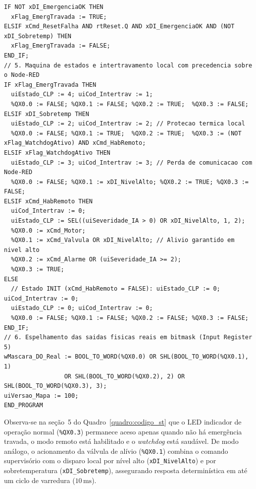 \begin{quadro}[htb]
\begin{lstlisting}[language=IECST, basicstyle=\linespread{0.85}\selectfont\ttfamily\tiny\color{black}]
IF NOT xDI_EmergenciaOK THEN
  xFlag_EmergTravada := TRUE;
ELSIF xCmd_ResetFalha AND rtReset.Q AND xDI_EmergenciaOK AND (NOT xDI_Sobretemp) THEN
  xFlag_EmergTravada := FALSE;
END_IF;
// 5. Maquina de estados e intertravamento local com precedencia sobre o Node-RED
IF xFlag_EmergTravada THEN
  uiEstado_CLP := 4; uiCod_Intertrav := 1;
  %QX0.0 := FALSE; %QX0.1 := FALSE; %QX0.2 := TRUE;  %QX0.3 := FALSE;
ELSIF xDI_Sobretemp THEN
  uiEstado_CLP := 2; uiCod_Intertrav := 2; // Protecao termica local
  %QX0.0 := FALSE; %QX0.1 := TRUE;  %QX0.2 := TRUE;  %QX0.3 := (NOT xFlag_WatchdogAtivo) AND xCmd_HabRemoto;
ELSIF xFlag_WatchdogAtivo THEN
  uiEstado_CLP := 3; uiCod_Intertrav := 3; // Perda de comunicacao com Node-RED
  %QX0.0 := FALSE; %QX0.1 := xDI_NivelAlto; %QX0.2 := TRUE; %QX0.3 := FALSE;
ELSIF xCmd_HabRemoto THEN
  uiCod_Intertrav := 0;
  uiEstado_CLP := SEL((uiSeveridade_IA > 0) OR xDI_NivelAlto, 1, 2);
  %QX0.0 := xCmd_Motor;
  %QX0.1 := xCmd_Valvula OR xDI_NivelAlto; // Alivio garantido em nivel alto
  %QX0.2 := xCmd_Alarme OR (uiSeveridade_IA >= 2);
  %QX0.3 := TRUE;
ELSE
  // Estado INIT (xCmd_HabRemoto = FALSE): uiEstado_CLP := 0; uiCod_Intertrav := 0;
  uiEstado_CLP := 0; uiCod_Intertrav := 0;
  %QX0.0 := FALSE; %QX0.1 := FALSE; %QX0.2 := FALSE; %QX0.3 := FALSE;
END_IF;
// 6. Espelhamento das saidas fisicas reais em bitmask (Input Register 5)
wMascara_DO_Real := BOOL_TO_WORD(%QX0.0) OR SHL(BOOL_TO_WORD(%QX0.1), 1)
                 OR SHL(BOOL_TO_WORD(%QX0.2), 2) OR SHL(BOOL_TO_WORD(%QX0.3), 3);
uiVersao_Mapa := 100;
END_PROGRAM
  \end{lstlisting}
\end{quadro}

Observa-se na seção~5 do Quadro~\ref{quadro:codigo_st} que o LED indicador de operação normal (\texttt{\%QX0.3}) permanece aceso apenas quando não há emergência travada, o modo remoto está habilitado e o \textit{watchdog} está saudável. De modo análogo, o acionamento da válvula de alívio (\texttt{\%QX0.1}) combina o comando supervisório com o disparo local por nível alto (\texttt{xDI\_NivelAlto}) e por sobretemperatura (\texttt{xDI\_Sobretemp}), assegurando resposta determinística em até um ciclo de varredura ($10\,\text{ms}$).
